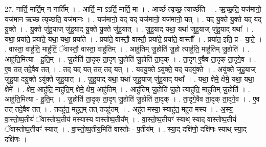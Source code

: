 \documentclass[17pt]{extarticle}
\begin{document}
27. नार्ति॒ मार्ति॒म् न नार्ति᳚म् । . आर्ति॒ मा ऽऽर्ति॒ मार्ति॒ मा । . आर्च्छ॑ त्यृच्छ॒ त्यार्च्छ॑ति । . ऋ॒च्छ॒ति॒ यज॑मानो॒ यज॑मान ऋच्छ त्यृच्छति॒ यज॑मानः । . यज॑मानो॒ यद् यद् यज॑मानो॒ यज॑मानो॒ यत् । . यद् यु॒क्ते यु॒क्ते यद् यद् यु॒क्ते । . यु॒क्ते जु॑हु॒याज् जु॑हु॒याद् यु॒क्ते यु॒क्ते जु॑हु॒यात् । . जु॒हु॒याद् यथा॒ यथा॑ जुहु॒याज् जु॑हु॒याद् यथा᳚ । . यथा॒ प्रया॑ते॒ प्रया॑ते॒ यथा॒ यथा॒ प्रया॑ते । . प्रया॑ते॒ वास्तौ॒ वास्तौ॒ प्रया॑ते॒ प्रया॑ते॒ वास्तौ᳚ । . प्रया॑त॒ इति॒ प्र - या॒ते॒ । . वास्ता॒ वाहु॑ति॒ माहु॑तिं॒ ॅवास्तौ॒ वास्ता॒ वाहु॑तिम् । . आहु॑तिम् जु॒होति॑ जु॒हो त्याहु॑ति॒ माहु॑तिम् जु॒होति॑ । . आहु॑ति॒मित्या - हु॒ति॒म् । . जु॒होति॑ ता॒दृक् ता॒दृग् जु॒होति॑ जु॒होति॑ ता॒दृक् । . ता॒दृग् ए॒वैव ता॒दृक् ता॒दृगे॒व । . ए॒व तत् तदे॒वैव तत् । . तद् यद् यत् तत् तद् यत् । . यदयु॒क्ते ऽयु॑क्ते॒ यद् यदयु॑क्ते । . अयु॑क्ते जुहु॒याज् जु॑हु॒या दयु॒क्ते ऽयु॑क्ते जुहु॒यात् । . जु॒हु॒याद् यथा॒ यथा॑ जुहु॒याज् जु॑हु॒याद् यथा᳚ । . यथा॒ क्षेमे॒ क्षेमे॒ यथा॒ यथा॒ क्षेमे᳚ । . क्षेम॒ आहु॑ति॒ माहु॑ति॒म् क्षेमे॒ क्षेम॒ आहु॑तिम् । . आहु॑तिम् जु॒होति॑ जु॒हो त्याहु॑ति॒ माहु॑तिम् जु॒होति॑ । . आहु॑ति॒मित्या - हु॒ति॒म् । . जु॒होति॑ ता॒दृक् ता॒दृग् जु॒होति॑ जु॒होति॑ ता॒दृक् । . ता॒दृगे॒वैव ता॒दृक् ता॒दृगे॒व । . ए॒व तत् तदे॒वैव तत् । . तदहु॑त॒ महु॑त॒म् तत् तदहु॑तम् । . अहु॑त मस्या॒ स्याहु॑त॒ महु॑त मस्य । . अ॒स्य॒ वा॒स्तो॒ष्प॒तीयं॑ ॅवास्तोष्प॒तीय॑ मस्यास्य वास्तोष्प॒तीय᳚म् । . वा॒स्तो॒ष्प॒तीयꣳ॑ स्याथ् स्याद् वास्तोष्प॒तीयं॑ ॅवास्तोष्प॒तीयꣳ॑ स्यात् । . वा॒स्तो॒ष्प॒तीय॒मिति॑ वास्तोः - प॒तीय᳚म् । . स्या॒द् दक्षि॑णो॒ दक्षि॑णः स्याथ् स्या॒द् दक्षि॑णः । \newline
\end{document}
